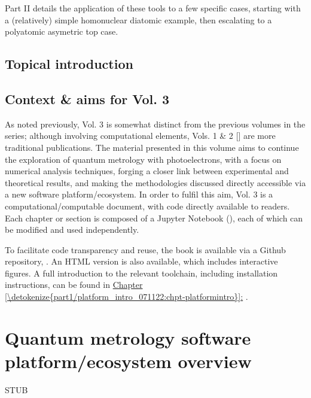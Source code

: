 \documentclass[letterpaper,10pt,english]{jupyterBook}
\begin{document}
\sphinxAtStartPar
Part II details the application of these tools to a few specific cases, starting with a (relatively) simple homonuclear diatomic example, then escalating to a polyatomic asymetric top case.


\section{Topical introduction}
\label{\detokenize{part1/main_intro_051122:topical-introduction}}

\section{Context \& aims for Vol. 3}
\label{\detokenize{part1/main_intro_051122:context-aims-for-vol-3}}
\sphinxAtStartPar
As noted previously, Vol. 3 is somewhat distinct from the previous volumes in the series; although involving computational elements, Vols. 1 \& 2 {[}{]} are more traditional publications. The material presented in this volume aims to continue the exploration of quantum metrology with photoelectrons, with a focus on numerical analysis techniques, forging a closer link between experimental and theoretical results, and making the methodologies discussed directly accessible via a new software platform/ecosystem. In order to fulfil this aim, Vol. 3 is a computational/computable document, with code directly available to readers. Each chapter or section is composed of a Jupyter Notebook (), each of which can be modified and used independently.

\sphinxAtStartPar
To facilitate code transparency and reuse, the book is available via a Github repository, . An HTML version is also available, which includes interactive figures. A full introduction to the relevant tool\sphinxhyphen{}chain, including installation instructions, can be found in \hyperref[\detokenize{part1/platform_intro_071122:chpt-platformintro}]{Chapter \ref{\detokenize{part1/platform_intro_071122:chpt-platformintro}}:} {\hyperref[\detokenize{part1/platform_intro_071122:chpt-platformintro}]{}}.

\sphinxstepscope


\chapter{Quantum metrology software platform/ecosystem overview}
\label{\detokenize{part1/platform_intro_071122:quantum-metrology-software-platform-ecosystem-overview}}\label{\detokenize{part1/platform_intro_071122:chpt-platformintro}}\label{\detokenize{part1/platform_intro_071122::doc}}
\sphinxAtStartPar
STUB
\end{document}
